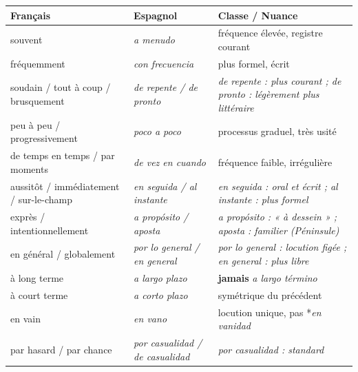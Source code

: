 \documentclass[11pt]{article}
\newcommand{\esp}[1]{\ifmmode\text{\textit{#1}}\else\begingroup\selectlanguage{spanish}\itshape #1\endgroup\fi}
\begin{document}
\begin{center}
\begin{tabularx}{\linewidth}{|X|X|X|}
\hline
\rowcolor{popblueL}
\textbf{Français} & \textbf{Espagnol} & \textbf{Classe / Nuance} \\
\hline
souvent & \esp{a menudo} & fréquence élevée, registre courant \\
\hline
fréquemment & \esp{con frecuencia} & plus formel, écrit \\
\hline
soudain / tout à coup / brusquement & \esp{de repente} / \esp{de pronto} & \esp{de repente} : plus courant ; \esp{de pronto} : légèrement plus littéraire \\
\hline
peu à peu / progressivement & \esp{poco a poco} & processus graduel, très usité \\
\hline
de temps en temps / par moments & \esp{de vez en cuando} & fréquence faible, irrégulière \\
\hline
aussitôt / immédiatement / sur-le-champ & \esp{en seguida} / \esp{al instante} & \esp{en seguida} : oral et écrit ; \esp{al instante} : plus formel \\
\hline
exprès / intentionnellement & \esp{a propósito} / \esp{aposta} & \esp{a propósito} : « à dessein » ; \esp{aposta} : familier (Péninsule) \\
\hline
en général / globalement & \esp{por lo general} / \esp{en general} & \esp{por lo general} : locution figée ; \esp{en general} : plus libre \\
\hline
à long terme & \esp{a largo plazo} & \textbf{jamais} \esp{a largo término} \\
\hline
à court terme & \esp{a corto plazo} & symétrique du précédent \\
\hline
en vain & \esp{en vano} & locution unique, pas *\esp{en vanidad} \\
\hline
par hasard / par chance & \esp{por casualidad} / \esp{de casualidad} & \esp{por casualidad} : standard \\
\hline
\end{tabularx}
\end{center}
\end{document}
